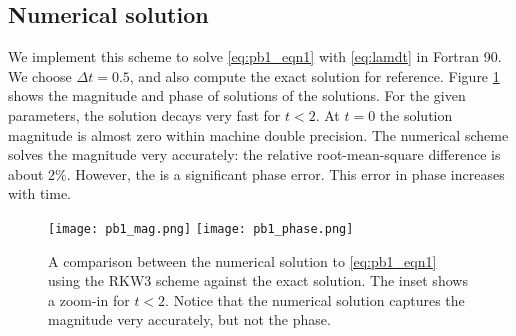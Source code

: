 \documentclass[11pt]{article}
\newcommand{\dt}{\Delta t}
\begin{document}
\subsection*{Numerical solution}
We implement this scheme to solve \eqref{eq:pb1_eqn1} with \eqref{eq:lamdt} in Fortran 90. We choose $\dt = 0.5$, and also compute the exact solution for reference. Figure \ref{fig:pb1} shows the magnitude and phase of solutions  of the solutions. For the given parameters, the solution decays very fast for $t<2$. At $t=0$ the solution magnitude is almost zero within machine double precision. The numerical scheme solves the magnitude very accurately: the relative root-mean-square difference is about $2\%$. However, the is a significant phase error. This error in phase increases with time. 

\begin{figure}[ht]
\begin{center}
\texttt{[image: pb1\_mag.png]}
\texttt{[image: pb1\_phase.png]}
\end{center}
\caption{A comparison between the numerical solution to \eqref{eq:pb1_eqn1} using the RKW3 scheme against the exact solution. The inset shows a zoom-in for $t<2$. Notice that the numerical solution captures the magnitude very accurately, but not the phase.}
\label{fig:pb1}
\end{figure}
\end{document}
